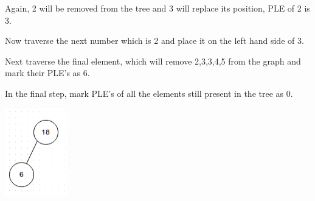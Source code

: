 \documentclass[letterpaper,portrait,12pt]{article}
\begin{document}
\begin{flushleft}
	Again, 2 will be removed from the tree and 3 will replace its position, PLE of 2 is 3.
\end{flushleft}


\begin{flushleft}
	Now traverse the next number which is 2 and place it on the left hand side of 3.
\end{flushleft}


\begin{flushleft}
	Next traverse the final element, which will remove 2,3,3,4,5 from the graph and mark their PLE's as 6.
\end{flushleft}


\begin{flushleft}

\end{flushleft}


\begin{flushleft}
In the final step, mark PLE's of all the elements still present in the tree as 0.
\end{flushleft}


\begin{flushleft}

\end{flushleft}


\begin{flushleft}
	\includegraphics[height=1.51in,width=1.06in]{7d2e89d6-1aae-11e3-8e67-99a1a326a3b2.png}

\end{flushleft}


\begin{flushleft}

\end{flushleft}


\begin{flushleft}

\end{flushleft}


\begin{flushleft}

\end{flushleft}
\end{document}
